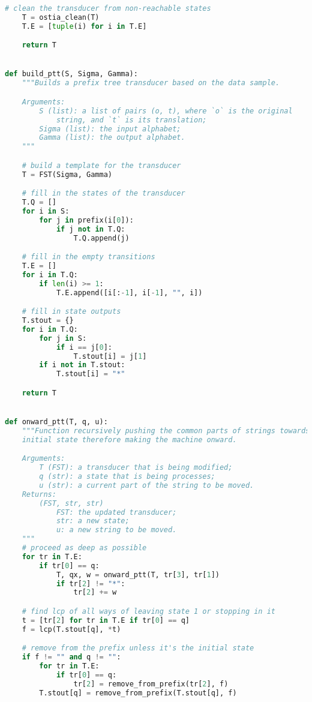 \begin{lstlisting}[language=Python]
    # clean the transducer from non-reachable states
    T = ostia_clean(T)
    T.E = [tuple(i) for i in T.E]

    return T


def build_ptt(S, Sigma, Gamma):
    """Builds a prefix tree transducer based on the data sample.

    Arguments:
        S (list): a list of pairs (o, t), where `o` is the original
            string, and `t` is its translation;
        Sigma (list): the input alphabet;
        Gamma (list): the output alphabet.
    """

    # build a template for the transducer
    T = FST(Sigma, Gamma)

    # fill in the states of the transducer
    T.Q = []
    for i in S:
        for j in prefix(i[0]):
            if j not in T.Q:
                T.Q.append(j)

    # fill in the empty transitions
    T.E = []
    for i in T.Q:
        if len(i) >= 1:
            T.E.append([i[:-1], i[-1], "", i])

    # fill in state outputs
    T.stout = {}
    for i in T.Q:
        for j in S:
            if i == j[0]:
                T.stout[i] = j[1]
        if i not in T.stout:
            T.stout[i] = "*"

    return T


def onward_ptt(T, q, u):
    """Function recursively pushing the common parts of strings towards the
    initial state therefore making the machine onward.

    Arguments:
        T (FST): a transducer that is being modified;
        q (str): a state that is being processes;
        u (str): a current part of the string to be moved.
    Returns:
        (FST, str, str)
            FST: the updated transducer;
            str: a new state;
            u: a new string to be moved.
    """
    # proceed as deep as possible
    for tr in T.E:
        if tr[0] == q:
            T, qx, w = onward_ptt(T, tr[3], tr[1])
            if tr[2] != "*":
                tr[2] += w

    # find lcp of all ways of leaving state 1 or stopping in it
    t = [tr[2] for tr in T.E if tr[0] == q]
    f = lcp(T.stout[q], *t)

    # remove from the prefix unless it's the initial state
    if f != "" and q != "":
        for tr in T.E:
            if tr[0] == q:
                tr[2] = remove_from_prefix(tr[2], f)
        T.stout[q] = remove_from_prefix(T.stout[q], f)


\end{lstlisting}
